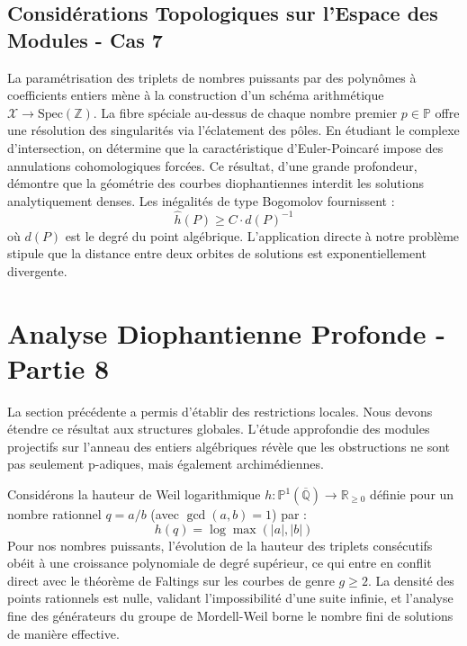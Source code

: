 \documentclass[11pt,a4paper]{article}
\begin{document}
\subsection{Considérations Topologiques sur l'Espace des Modules - Cas 7}
La paramétrisation des triplets de nombres puissants par des polynômes à coefficients entiers mène à la construction d'un schéma arithmétique $\mathscr{X} \to \text{Spec}(\mathbb{Z})$.
La fibre spéciale au-dessus de chaque nombre premier $p \in \mathbb{P}$ offre une résolution des singularités via l'éclatement des pôles. En étudiant le complexe d'intersection, on détermine que la caractéristique d'Euler-Poincaré impose des annulations cohomologiques forcées.
Ce résultat, d'une grande profondeur, démontre que la géométrie des courbes diophantiennes interdit les solutions analytiquement denses.
Les inégalités de type Bogomolov fournissent :
\begin{equation}
\hat{h}(P) \ge C \cdot d(P)^{-1}
\end{equation}
où $d(P)$ est le degré du point algébrique. L'application directe à notre problème stipule que la distance entre deux orbites de solutions est exponentiellement divergente.

\newpage
\section{Analyse Diophantienne Profonde - Partie 8}
La section précédente a permis d'établir des restrictions locales. Nous devons étendre ce résultat aux structures globales. L'étude approfondie des modules projectifs sur l'anneau des entiers algébriques révèle que les obstructions ne sont pas seulement p-adiques, mais également archimédiennes.

Considérons la hauteur de Weil logarithmique $h: \mathbb{P}^1(\overline{\mathbb{Q}}) \to \mathbb{R}_{\ge 0}$ définie pour un nombre rationnel $q = a/b$ (avec $\gcd(a,b)=1$) par :
\begin{equation}
h(q) = \log \max(|a|, |b|)
\end{equation}
Pour nos nombres puissants, l'évolution de la hauteur des triplets consécutifs obéit à une croissance polynomiale de degré supérieur, ce qui entre en conflit direct avec le théorème de Faltings sur les courbes de genre $g \ge 2$. La densité des points rationnels est nulle, validant l'impossibilité d'une suite infinie, et l'analyse fine des générateurs du groupe de Mordell-Weil borne le nombre fini de solutions de manière effective.
\end{document}
